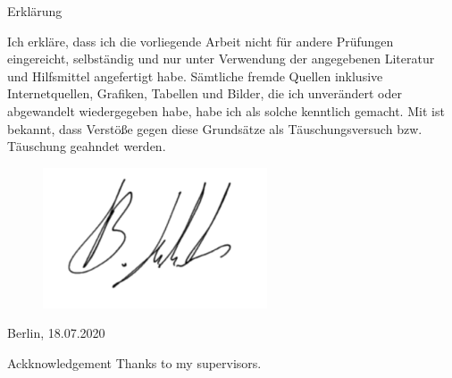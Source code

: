 \documentclass[10pt]{article}
\begin{document}
\onecolumn
\newpage
\large{Erkl\"arung}

Ich erkl\"are, dass ich die vorliegende Arbeit nicht f\"ur andere Pr\"ufungen eingereicht, selbst\"andig und nur unter Verwendung der angegebenen Literatur und Hilfsmittel angefertigt habe. S\"amtliche fremde Quellen inklusive Internetquellen, Grafiken, Tabellen und Bilder, die ich unver\"andert oder abgewandelt wiedergegeben habe, habe ich als solche kenntlich gemacht. Mit ist bekannt, dass Verst\"oße gegen diese Grunds\"atze als T\"auschungsversuch bzw. T\"auschung geahndet werden.


\begin{figure}[H]
\includegraphics[width=.3\columnwidth]{sig.png}
\end{figure}

Berlin, 18.07.2020


\newpage
\Large{Ackknowledgement}
Thanks to my supervisors. 
\end{document}

